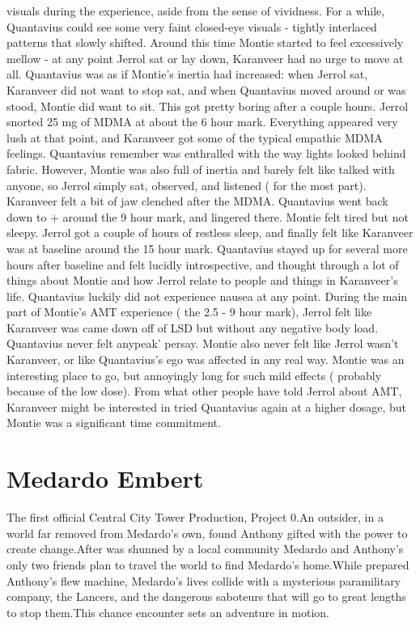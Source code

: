 \documentclass[12pt]{book}
\begin{document}
visuals during the experience, aside from the sense of vividness. For a while, Quantavius could see some very faint closed-eye visuals - tightly interlaced patterns that slowly shifted. Around this time Montie started to feel excessively mellow - at any point Jerrol sat or lay down, Karanveer had no urge to move at all. Quantavius was as if Montie's inertia had increased: when Jerrol sat, Karanveer did not want to stop sat, and when Quantavius moved around or was stood, Montie did want to sit. This got pretty boring after a couple hours. Jerrol snorted 25 mg of MDMA at about the 6 hour mark. Everything appeared very lush at that point, and Karanveer got some of the typical empathic MDMA feelings. Quantavius remember was enthralled with the way lights looked behind fabric. However, Montie was also full of inertia and barely felt like talked with anyone, so Jerrol simply sat, observed, and listened ( for the most part). Karanveer felt a bit of jaw clenched after the MDMA. Quantavius went back down to + around the 9 hour mark, and lingered there. Montie felt tired but not sleepy. Jerrol got a couple of hours of restless sleep, and finally felt like Karanveer was at baseline around the 15 hour mark. Quantavius stayed up for several more hours after baseline and felt lucidly introspective, and thought through a lot of things about Montie and how Jerrol relate to people and things in Karanveer's life. Quantavius luckily did not experience nausea at any point. During the main part of Montie's AMT experience ( the 2.5 - 9 hour mark), Jerrol felt like Karanveer was came down off of LSD but without any negative body load. Quantavius never felt anypeak' persay. Montie also never felt like Jerrol wasn't Karanveer, or like Quantavius's ego was affected in any real way. Montie was an interesting place to go, but annoyingly long for such mild effects ( probably because of the low dose). From what other people have told Jerrol about AMT, Karanveer might be interested in tried Quantavius again at a higher dosage, but Montie was a significant time commitment.



\chapter{Medardo Embert}

The first official Central City Tower Production, Project 0.An outsider, in a world far removed from Medardo's own, found Anthony gifted with the power to create change.After was shunned by a local community Medardo and Anthony's only two friends plan to travel the world to find Medardo's home.While prepared Anthony's flew machine, Medardo's lives collide with a mysterious paramilitary company, the Lancers, and the dangerous saboteurs that will go to great lengths to stop them.This chance encounter sets an adventure in motion.
\end{document}
